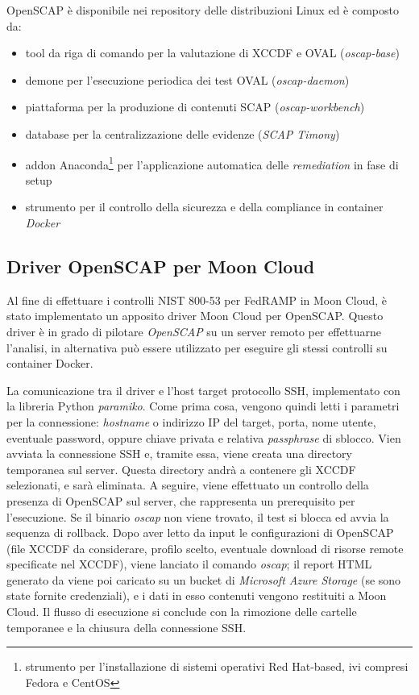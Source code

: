 \documentclass[../main.tex]{subfiles}
\begin{document}
OpenSCAP è disponibile nei repository delle distribuzioni Linux ed è composto da:
\begin{itemize}
    \item tool da riga di comando per la valutazione di XCCDF e OVAL (\textit{oscap-base})
    \item demone per l'esecuzione periodica dei test OVAL (\textit{oscap-daemon})
    \item piattaforma per la produzione di contenuti SCAP (\textit{oscap-workbench})
    \item database per la centralizzazione delle evidenze (\textit{SCAP Timony})
    \item addon Anaconda\footnote{strumento per l'installazione di sistemi operativi Red Hat-based, ivi compresi Fedora e CentOS} per l'applicazione automatica delle \textit{remediation} in fase di setup
    \item strumento per il controllo della sicurezza e della compliance in container \textit{Docker}
\end{itemize}


\subsection{Driver OpenSCAP per Moon Cloud}
Al fine di effettuare i controlli NIST 800-53 per FedRAMP in Moon Cloud, è stato implementato un apposito driver Moon Cloud per OpenSCAP.
Questo driver è in grado di pilotare \textit{OpenSCAP} su un server remoto per effettuarne l'analisi, in alternativa può essere utilizzato per eseguire gli stessi controlli su container Docker.

La comunicazione tra il driver e l'host target protocollo SSH, implementato con la libreria Python \textit{paramiko}.
Come prima cosa, vengono quindi letti i parametri per la connessione: \textit{hostname} o indirizzo IP del target, porta, nome utente, eventuale password, oppure chiave privata e relativa \textit{passphrase} di sblocco.
Vien avviata la connessione SSH e, tramite essa, viene creata una directory temporanea sul server. Questa directory andrà a contenere gli XCCDF selezionati, e sarà eliminata.
A seguire, viene effettuato un controllo della presenza di OpenSCAP sul server, che rappresenta un prerequisito per l'esecuzione. Se il binario \textit{oscap} non viene trovato, il test si blocca ed avvia la sequenza di rollback.
Dopo aver letto da input le configurazioni di OpenSCAP (file XCCDF da considerare, profilo scelto, eventuale download di risorse remote specificate nel XCCDF), viene lanciato il comando \textit{oscap}; il report HTML generato da viene poi caricato su un bucket di \textit{Microsoft Azure Storage} (se sono state fornite credenziali), e i dati in esso contenuti vengono restituiti a Moon Cloud.
Il flusso di esecuzione si conclude con la rimozione delle cartelle temporanee e la chiusura della connessione SSH.
\end{document}
